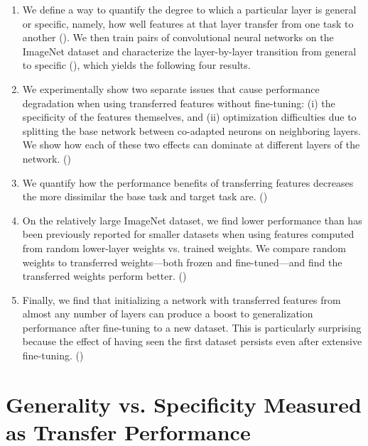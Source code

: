 \begin{enumerate}[leftmargin=2em]

\item We define a way to quantify the degree to which a particular layer is general or specific, namely, how well features at that layer transfer from one task to another (). We then train pairs of convolutional neural networks on the ImageNet dataset and characterize the layer-by-layer transition from general to specific (), which yields the following four results. 

\item We experimentally show two separate issues that cause performance degradation when using transferred features without fine-tuning: (i) the specificity of the features themselves, and (ii) optimization difficulties due to splitting the base network between co-adapted neurons on neighboring layers. We show how each of these two effects can dominate at different layers of the network. ()

\item We quantify how the performance benefits of transferring features decreases the more dissimilar the base
task and target task are. ()

\item On the relatively large ImageNet dataset, we find lower performance than has been previously reported for smaller datasets \citep{Jarrett-ICCV2009} when using features computed from random lower-layer weights vs. trained weights. We compare random weights to transferred weights---both frozen and fine-tuned---and find the transferred weights perform better. ()

\item Finally, we find that initializing a network with transferred features from almost any number of layers can produce a boost to generalization performance after fine-tuning to a new dataset. This is particularly surprising because the effect of having seen the first dataset persists even after extensive fine-tuning.
()

\end{enumerate}






\section{Generality vs. Specificity Measured as Transfer Performance}

